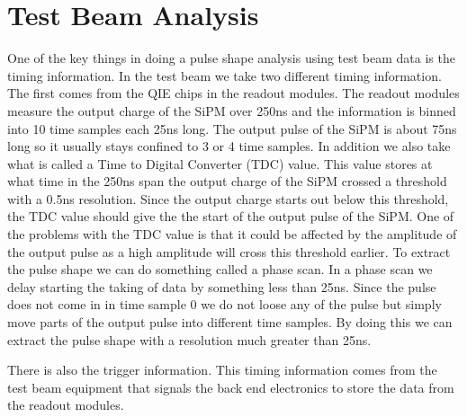\section{Test Beam Analysis}

One of the key things in doing a pulse shape analysis using test beam data is the timing information. In the test beam we take two different timing information. The first comes from the QIE chips in the readout modules. The readout modules measure the output charge of the SiPM over 250ns and the information is binned into 10 time samples each 25ns long. The output pulse of the SiPM is about 75ns long so it usually stays confined to 3 or 4 time samples. In addition we also take what is called a Time to Digital Converter (TDC) value. This value stores at what time in the 250ns span the output charge of the SiPM crossed a threshold with a 0.5ns resolution. Since the output charge starts out below this threshold, the TDC value should give the the start of the output pulse of the SiPM. One of the problems with the TDC value is that it could be affected by the amplitude of the output pulse as a high amplitude will cross this threshold earlier. To extract the pulse shape we can do something called a phase scan. In a phase scan we delay starting the taking of data by something less than 25ns. Since the pulse does not come in in time sample 0 we do not loose any of the pulse but simply move parts of the output pulse into different time samples. By doing this we can extract the pulse shape with a resolution much greater than 25ns. 


There is also the trigger information. This timing information comes from the test beam equipment that signals the back end electronics to store the data from the readout modules. 